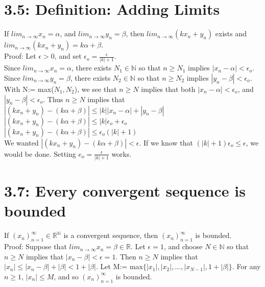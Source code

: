 \documentclass[10pt,letter]{report}
\begin{document}
\section*{3.5: Definition: Adding Limits}
If $lim_{n\rightarrow\infty}x_n = \alpha$, and $lim_{n\rightarrow\infty}y_n = \beta$, then $lim_{n\rightarrow\infty}(kx_n + y_n)$ exists and $lim_{n\rightarrow\infty}(kx_n + y_n) = k\alpha + \beta$.\\ 
Proof: Let $\epsilon > 0$, and set $\epsilon_o = \frac{\epsilon}{|k|+1}$.\\ 
Since $lim_{n\rightarrow\infty}x_n = \alpha$, there exists $N_1 \in \mathbb{N}$ so that $n\geq N_1$ implies $|x_n - \alpha| < \epsilon_o$. \\ 
Since $lim_{n\rightarrow\infty}y_n = \beta$, there exists $N_2 \in \mathbb{N}$ so that $n\geq N_2$ implies $|y_n - \beta| < \epsilon_o$. \\ 
With N:= max($N_1, N_2$), we see that $n \geq N$ implies that both $|x_n - \alpha| < \epsilon_o$, and $|y_n - \beta| < \epsilon_o$. Thus $n \geq N$ implies that \\ 
$|(kx_n+y_n) - (k\alpha+\beta)| \leq |k||x_n - \alpha|+|y_n - \beta|$\\
$|(kx_n+y_n) - (k\alpha+\beta)| \leq |k|\epsilon_o +\epsilon_o$\\
$|(kx_n+y_n) - (k\alpha+\beta)| \leq \epsilon_o(|k|+1)$\\ 
We wanted $|(kx_n+y_n)-(k\alpha+\beta)| < \epsilon$. If we know that $(|k|+1)\epsilon_o \leq \epsilon$, we would be done. Setting $e_o = \frac{\epsilon}{|k|+1}$ works. 

\section*{3.7: Every convergent sequence is bounded}
If $(x_n)_{n=1}^\infty \in \mathbb{R}^\mathbb{N}$ is a convergent sequence, then $(x_n)_{n=1}^\infty$ is bounded.\\ 
Proof: Suppose that $lim_{n\rightarrow\infty}x_n = \beta \in \mathbb{R}$. Let $\epsilon = 1$, and choose $N \in \mathbb{N}$ so that $n \geq N$ implies that $|x_n - \beta| < \epsilon = 1$. Then $n \geq N$ implies that $|x_n| \leq |x_n - \beta| + |\beta| < 1 + |\beta|$. Let M:= max$\{|x_1|, |x_2|, ... ,|x_{N-1}|, 1 + |\beta|\}$. For any $n\geq 1$, $|x_n| \leq M$, and so $(x_n)_{n=1}^\infty$ is bounded. 
\end{document}
